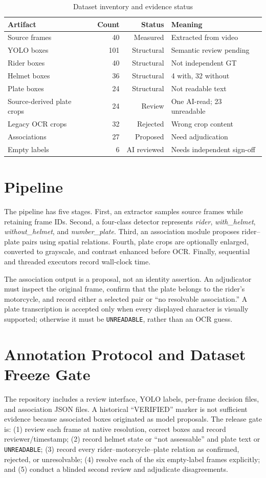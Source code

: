 \documentclass[journal]{IEEEtran}
\begin{document}
\begin{table}[!t]\caption{Dataset inventory and evidence status}\label{tab:inventory}\centering\begin{tabular}{p{2.5cm}rrp{2.0cm}}\toprule Artifact&Count&Status&Meaning\\\midrule Source frames&40&Measured&Extracted from video\\ YOLO boxes&101&Structural&Semantic review pending\\ Rider boxes&40&Structural&Not independent GT\\ Helmet boxes&36&Structural&4 with, 32 without\\ Plate boxes&24&Structural&Not readable text\\ Source-derived plate crops&24&Review&One AI-read; 23 unreadable\\ Legacy OCR crops&32&Rejected&Wrong crop content\\ Associations&27&Proposed&Need adjudication\\ Empty labels&6&AI reviewed&Needs independent sign-off\\\bottomrule\end{tabular}\end{table}

\section{Pipeline}
The pipeline has five stages. First, an extractor samples source frames while retaining frame IDs. Second, a four-class detector represents \emph{rider}, \emph{with\_helmet}, \emph{without\_helmet}, and \emph{number\_plate}. Third, an association module proposes rider--plate pairs using spatial relations. Fourth, plate crops are optionally enlarged, converted to grayscale, and contrast enhanced before OCR. Finally, sequential and threaded executors record wall-clock time.

The association output is a proposal, not an identity assertion. An adjudicator must inspect the original frame, confirm that the plate belongs to the rider's motorcycle, and record either a selected pair or ``no resolvable association.'' A plate transcription is accepted only when every displayed character is visually supported; otherwise it must be \texttt{UNREADABLE}, rather than an OCR guess.

\section{Annotation Protocol and Dataset Freeze Gate}
The repository includes a review interface, YOLO labels, per-frame decision files, and association JSON files. A historical ``VERIFIED'' marker is not sufficient evidence because associated boxes originated as model proposals. The release gate is: (1) review each frame at native resolution, correct boxes and record reviewer/timestamp; (2) record helmet state or ``not assessable'' and plate text or \texttt{UNREADABLE}; (3) record every rider--motorcycle--plate relation as confirmed, rejected, or unresolvable; (4) resolve each of the six empty-label frames explicitly; and (5) conduct a blinded second review and adjudicate disagreements.
\end{document}
